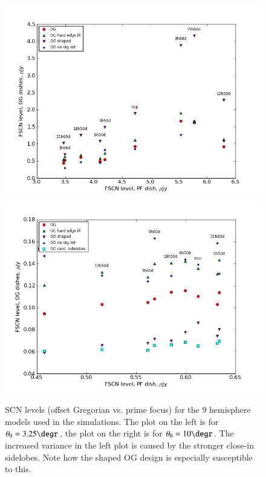 \documentclass{aa}
\begin{document}
\begin{figure}
  \includegraphics[width=\columnwidth]{cc-fields-325}
  \includegraphics[width=\columnwidth]{cc-fields-10}
\caption{\label{fig:fscn-fields}SCN levels (offset Gregorian vs. prime focus) for the 9 hemisphere models used in the simulations. The plot on the left is for $\theta_0=3.25\degr$, the plot on the right is for $\theta_0=10\degr$. The increased variance in the left plot is caused by the stronger close-in sidelobes. Note how the shaped OG design is especially susceptible to this.}
\end{figure}
\end{document}
